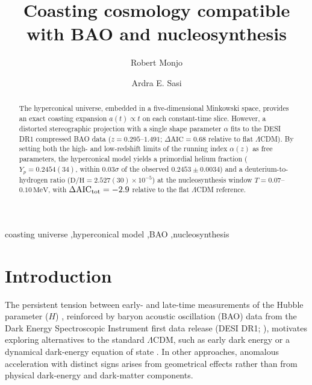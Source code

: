 ﻿\documentclass[3p,twocolumn]{elsarticle}
\begin{document}
\begin{frontmatter}

\title{Coasting cosmology compatible with BAO and nucleosynthesis}

\author[cunef,chile]{Robert Monjo}
\author[mgU]{Ardra E. Sasi}

\address[cunef]{Department of Mathematics, CUNEF Universidad, Calle Almansa 101, Madrid 28040, Spain}
\address[chile]{Centro de Estudios Cosmologicos ``Prof. Jaime Roessler Bonzi'', Facultad de Ciencias, Universidad de Chile, Las Palmeras 3425, \~Nunoa, Santiago 7750000, Chile}
\address[mgU]{School of Pure and Applied Physics, Mahatma Gandhi University, Priyadarsini Hills P.O. Athirampuzha, Kottayam, Kerala 686560, India}


\begin{abstract}
The hyperconical universe, embedded in a five-dimensional Minkowski space, provides an exact coasting expansion $a(t)\propto t$ on each constant-time slice. However, a distorted stereographic projection with a single shape parameter $\alpha$ fits to the DESI DR1 compressed BAO data ($z=0.295$--$1.491$; $\Delta\mathrm{AIC}=0.68$ relative to flat $\Lambda$CDM). By setting both the high- and low-redshift limits of the running index $\alpha(z)$ as free parameters, the hyperconical model yields a primordial helium fraction ($Y_p=0.2454(34)$, within $0.03\sigma$ of the observed $0.2453\pm0.0034$) and a deuterium-to-hydrogen ratio ($\mathrm{D/H}=2.527(30)\times10^{-5}$) at the nucleosynthesis window $T=0.07$--$0.10\,\mathrm{MeV}$, with $\Delta\mathrm{AIC}_{\rm tot}= -2.9$ relative to the flat $\Lambda$CDM reference.
\end{abstract}


\begin{keyword}
coasting universe \sep hyperconical model \sep BAO \sep nucleosynthesis
\end{keyword}

\end{frontmatter}

\section{Introduction}

The persistent tension between early- and late-time measurements of the Hubble parameter ($H$) \cite{verde2019tensions,  monjo2023hubble}, reinforced by baryon acoustic oscillation (BAO) data from the Dark Energy Spectroscopic Instrument first data release (DESI DR1; \cite{adame2025desi}), motivates exploring alternatives to the standard $\Lambda$CDM, such as early dark energy \cite{poulin2019ede} or a dynamical dark-energy equation of state \cite{linder2003dde}. In other approaches, anomalous acceleration with distinct signs arises from geometrical effects rather than from physical dark-energy and dark-matter components.
\end{document}
